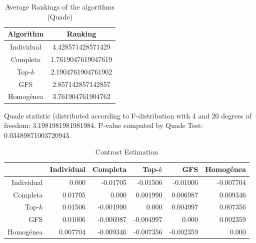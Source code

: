 \documentclass[a4paper,10pt]{article}
\begin{document}
\begin{landscape}
\newpage

\begin{table}[!htp]
\centering
\caption{Average Rankings of the algorithms (Quade)
}\begin{tabular}{c|c}
Algorithm&Ranking\\
\hline
Individual&4.428571428571429\\
Completa&1.7619047619047619\\
Top-$k$&2.1904761904761902\\
GFS&2.857142857142857\\
Homogénea&3.761904761904762\\
\end{tabular}
\end{table}
Quade statistic (distributed according to F-distribution with 4 and 20 degrees of freedom: 3.1981981981981984. 
P-value computed by Quade Test: 0.03489871003720943.\newline


\newpage

\begin{table}[!htp]
\centering\tiny
\caption{Contrast Estimation}
\begin{tabular}{
|r|r|r|r|r|r|}
\hline
 &Individual&Completa&Top-$k$&GFS&Homogénea\\
\hline
Individual&0.000&-0.01705&-0.01506&-0.01006&-0.007704\\
\hline
Completa&0.01705&0.000&0.001990&0.006987&0.009346\\
\hline
Top-$k$&0.01506&-0.001990&0.000&0.004997&0.007356\\
\hline
GFS&0.01006&-0.006987&-0.004997&0.000&0.002359\\
\hline
Homogénea&0.007704&-0.009346&-0.007356&-0.002359&0.000\\
\hline

\end{tabular}
\end{table}

\newpage


\end{landscape}
\end{document}
